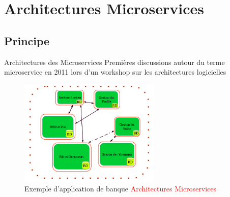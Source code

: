 \documentclass{beamer}
\begin{document}
\section{Architectures Microservices}
\subsection*{Principe}
\begin{frame}{Architectures des Microservices}
          Premières discussions autour du terme microservice en 2011 lors d’un workshop sur les architectures logicielles
     \begin{figure}
            \begin{center}
                \includegraphics[width=0.6\textwidth]{Microservices.png}
                \caption{Exemple d'application de banque \textcolor{red}{Architectures Microservices}}
            \end{center}
        \end{figure}



   \end{frame} 
\end{document}
